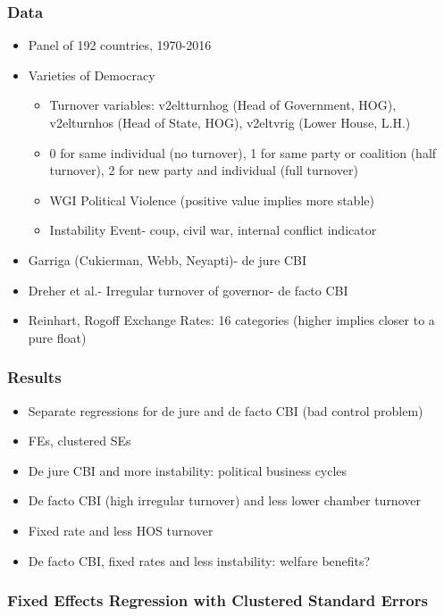 \documentclass{beamer}
\begin{document}
    \begin{frame}
        \frametitle{Data}
        \begin{itemize}
            \item Panel of 192 countries, 1970-2016
            \item Varieties of Democracy
            \begin{itemize}
                \item Turnover variables: v2eltturnhog (Head of Government, HOG), v2elturnhos (Head of State, HOG), v2eltvrig (Lower House, L.H.)
                \item 0 for same individual (no turnover), 1 for same party or coalition (half turnover), 2 for new party and individual (full turnover)
                \item WGI Political Violence (positive value implies more stable)
                \item Instability Event- coup, civil war, internal conflict indicator
            \end{itemize}
            \item Garriga (Cukierman, Webb, Neyapti)- de jure CBI
            \item Dreher et al.- Irregular turnover of governor- de facto CBI
            \item Reinhart, Rogoff Exchange Rates: 16 categories (higher implies closer to a pure float)
        \end{itemize}
    \end{frame}

    \begin{frame}
        \frametitle{Results}
        \begin{itemize}
            \item Separate regressions for de jure and de facto CBI (bad control problem)
            \item FEs, clustered SEs
            \item De jure CBI and more instability: political business cycles
            \item De facto CBI (high irregular turnover) and less lower chamber turnover
            \item Fixed rate and less HOS turnover
            \item De facto CBI, fixed rates and less instability: welfare benefits?
        \end{itemize}
    \end{frame}

    \begin{frame}
        \frametitle{Fixed Effects Regression with Clustered Standard Errors}
        {
            \let\oldcentering\centering
            \renewcommand\centering{\tiny\oldcentering}
            
        }
    \end{frame}
\end{document}
